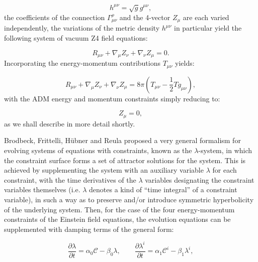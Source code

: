 \documentclass{article}
\begin{document}
\begin{equation}
h^{\mu \nu} = \sqrt{g} g^{\mu \nu},
\end{equation}
the coefficients of the connection ${\Gamma_{\mu \nu}^{\rho}}$ and the 4-vector ${Z_{\mu}}$ are each varied independently, the variations of the metric density ${h^{\mu \nu}}$ in particular yield the following system of vacuum Z4 field equations:

\begin{equation}
R_{\mu \nu} + \nabla_{\mu} Z_{\nu} + \nabla_{\nu} Z_{\mu} = 0.
\end{equation}
Incorporating the energy-momentum contributions ${T_{\mu \nu}}$ yields:

\begin{equation}
R_{\mu \nu} + \nabla_{\mu} Z_{\nu} + \nabla_{\nu} Z_{\mu} = 8 \pi \left( T_{\mu \nu} - \frac{1}{2} T g_{\mu \nu} \right),
\end{equation}
with the ADM energy and momentum constraints simply reducing to:

\begin{equation}
Z_{\mu} = 0,
\end{equation}
as we shall describe in more detail shortly.

Brodbeck, Frittelli, H\"ubner and Reula\cite{brodbeck} proposed a very general formalism for evolving systems of equations with constraints, known as the ${\lambda}$-system, in which the constraint surface forms a set of attractor solutions for the system. This is achieved by supplementing the system with an auxiliary variable ${\lambda}$ for each constraint, with the time derivatives of the ${\lambda}$ variables designating the constraint variables themselves (i.e. ${\lambda}$ denotes a kind of ``time integral'' of a constraint variable), in such a way as to preserve and/or introduce symmetric hyperbolicity of the underlying system. Then, for the case of the four energy-momentum constraints of the Einstein field equations, the evolution equations can be supplemented with damping terms of the general form:

\begin{equation}
\frac{\partial \lambda}{\partial t} = \alpha_0 \mathcal{C} - \beta_0 \lambda, \qquad \frac{\partial \lambda^i}{\partial t} = \alpha_1 \mathcal{C}^i - \beta_1 \lambda^i,
\end{equation}
\end{document}
